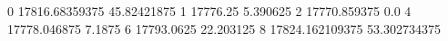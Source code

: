 0 17816.68359375 45.82421875
1 17776.25 5.390625
2 17770.859375 0.0
4 17778.046875 7.1875
6 17793.0625 22.203125
8 17824.162109375 53.302734375
